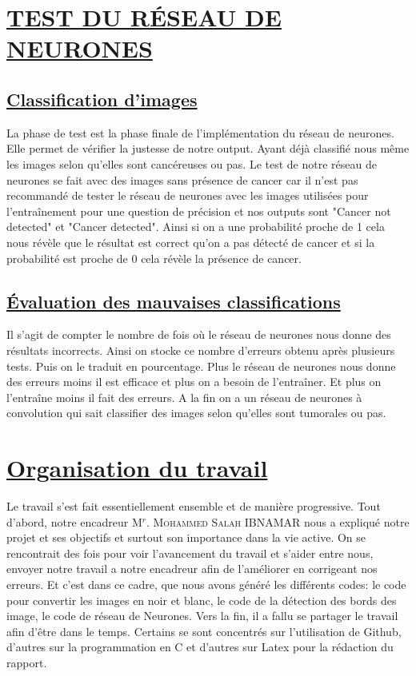 \documentclass[11pt]{article}
\begin{document}
\section{\underline{TEST DU RÉSEAU DE NEURONES}}
\subsection{\underline{Classification d'images}}

La phase de test est la phase finale de l'implémentation du réseau de neurones. Elle permet de vérifier la justesse de notre output. Ayant déjà classifié nous même les images selon qu'elles sont cancéreuses ou pas. Le test de notre réseau de neurones se fait avec des images sans présence de cancer car il n'est pas recommandé de tester le réseau de neurones avec les images utilisées pour l'entraînement pour une question de précision et nos outputs sont "Cancer not detected" et "Cancer detected". Ainsi si on a une probabilité proche de 1 cela nous révèle que le résultat est correct qu'on a pas détecté de cancer et si la probabilité est proche de 0 cela révèle la présence de cancer.

\subsection{\underline{Évaluation des mauvaises classifications}}

Il s'agit de compter le nombre de fois où le réseau de neurones nous donne des résultats incorrects. Ainsi on stocke ce nombre d'erreurs obtenu après plusieurs tests. Puis on le traduit en pourcentage. Plus le réseau de neurones nous donne des erreurs moins il est efficace et plus on a besoin de l'entraîner. Et plus on l'entraîne moins il fait des erreurs. A la fin on a un réseau de neurones à convolution qui sait classifier des images selon qu'elles sont tumorales ou pas.

\section{\underline{Organisation du travail}}
Le travail s’est fait essentiellement ensemble et de manière progressive.
Tout d’abord, notre encadreur M$^{r}$. \textsc{Mohammed Salah} IBNAMAR  nous a expliqué notre projet et ses objectifs et surtout son importance dans la vie active.
On se rencontrait des fois pour voir l'avancement  du travail et s'aider entre nous, envoyer notre travail a notre encadreur afin de l'améliorer en corrigeant nos erreurs. Et c'est dans ce cadre, que nous avons généré les différents codes:
le code pour convertir les images en noir et blanc,
le code de la détection des bords des image,
le code de réseau de Neurones.
Vers la fin, il a fallu se partager le travail afin d’être dans le temps. Certains se sont concentrés sur l'utilisation de Github, d'autres sur la programmation en C et d’autres sur Latex pour la rédaction du rapport.
\end{document}
